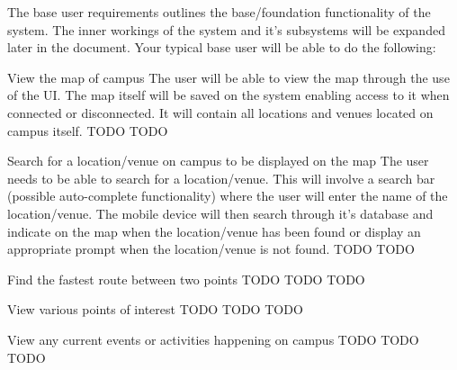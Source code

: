 The base user requirements outlines the base/foundation functionality of the system. The inner workings of the system and it's subsystems will be expanded later in the document. Your typical base user will be able to do the following:

\FuncReq
{View the map of campus}
{The user will be able to view the map through the use of the UI. The map itself will be saved on the system enabling access to it when connected or disconnected. It will contain all locations and venues located on campus itself.}
{TODO}
{TODO}

\FuncReq
{Search for a location/venue on campus to be displayed on the map}
{The user needs to be able to search for a location/venue. This will involve a search bar (possible auto-complete functionality) where the user will enter the name of the location/venue. The mobile device will then search through it's database and indicate on the map when the location/venue has been found or display an appropriate prompt when the location/venue is not found.}
{TODO}
{TODO}

\FuncReq
{Find the fastest route between two points}%
{TODO}
{TODO}
{TODO}

\FuncReq
{View various points of interest}
{TODO}
{TODO}
{TODO}

\FuncReq
{View any current events or activities happening on campus}
{TODO}
{TODO}
{TODO}
